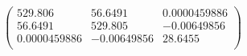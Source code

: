\documentclass{article}
\begin{document}
\[\left(
\begin{array}{ccc}
 529.806 & 56.6491 & 0.0000459886 \\
 56.6491 & 529.805 & -0.00649856 \\
 0.0000459886 & -0.00649856 & 28.6455 \\
\end{array}
\right)\]
\end{document}
